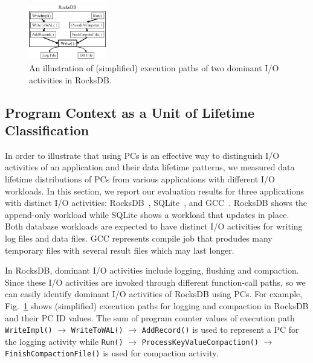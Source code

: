 \begin{figure}[t]
	\centering
	\includegraphics[width=0.3\textwidth]{figure/writepath}
	\caption{An illustration of (simplified) execution paths of two dominant I/O activities in RocksDB.}
	\label{fig:iopath}
\end{figure}


\subsection{Program Context as a Unit of Lifetime Classification}
In order to illustrate that using PCs is an effective way to distinguish I/O
activities of an application and their data lifetime patterns, 
we measured data lifetime distributions of PCs from various applications with 
different I/O workloads.  
In this section, we report our evaluation results for three applications with distinct I/O
activities: RocksDB~\cite{RocksDB}, SQLite~\cite{SQLite}, and GCC~\cite{GCC}.
{\color{blue}
RocksDB shows the append-only workload while SQLite shows a workload 
that updates in place.
Both database workloads are expected to have distinct I/O activities 
for writing log files and data files.
GCC represents compile job that produdes many temporary files with several 
result files which may last longer.
}

In RocksDB, dominant I/O activities include logging, flushing and compaction.
Since these I/O activities are invoked through different 
function-call paths, so we can easily
identify dominant I/O activities of RocksDB using PCs.  
For example, Fig.~\ref{fig:iopath} shows 
(simplified) execution paths for 
logging and compaction in RocksDB and their PC ID values.  
The sum of program counter values of execution path
\texttt{WriteImpl()} $\rightarrow$ \texttt{WriteToWAL()} $\rightarrow$ \texttt{AddRecord()} is used
to represent a PC for the logging activity while  \texttt{Run()} $\rightarrow$
\texttt{ProcessKeyValueCompaction()} $\rightarrow$ \texttt{FinishCompactionFile()} is used
for compaction activity.


